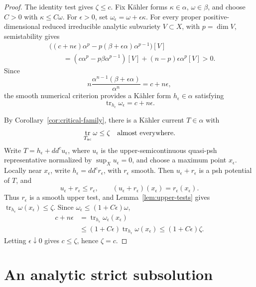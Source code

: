 \documentclass[reqno]{amsart}
\numberwithin{equation}{section}
\theoremstyle{definition}
\DeclareMathOperator{\tr}{tr}
\begin{document}
\begin{proof}
The identity test gives $\zeta\le c$. Fix K\"ahler forms
$\kappa\in\alpha$, $\omega\in\beta$, and choose $C>0$
with $\kappa\le C\omega$. For $\epsilon>0$, set
$\omega_\epsilon=\omega+\epsilon\kappa$. For every proper
positive-dimensional reduced irreducible analytic subvariety
$V\subset X$, with $p=\dim V$, semistability gives
\[
\begin{aligned}
&\bigl((c+n\epsilon)\alpha^p
-p(\beta+\epsilon\alpha)\alpha^{p-1}\bigr)[V]\\
&\qquad=(c\alpha^p-p\beta\alpha^{p-1})[V]
+(n-p)\epsilon\alpha^p[V]>0.
\end{aligned}
\]
Since
\[
n\frac{\alpha^{n-1}(\beta+\epsilon\alpha)}{\alpha^n}
=c+n\epsilon,
\]
the smooth numerical criterion \cite[Corollary 1.2]{S20}
provides a K\"ahler form $h_\epsilon\in\alpha$ satisfying
\[
\tr_{h_\epsilon}\omega_\epsilon=c+n\epsilon.
\]

By Corollary~\ref{cor:critical-family},
there is a K\"ahler current $T\in\alpha$ with
\[
\tr_{T_{\rm ac}}\omega\le\zeta
\quad\text{almost everywhere}.
\]
Write $T=h_\epsilon+dd^cu_\epsilon$, where $u_\epsilon$
is the upper-semicontinuous quasi-psh representative normalized
by $\sup_Xu_\epsilon=0$, and choose a maximum point
$x_\epsilon$. Locally near $x_\epsilon$, write
$h_\epsilon=dd^cr_\epsilon$, with $r_\epsilon$ smooth.
Then $u_\epsilon+r_\epsilon$ is a psh potential of $T$, and
\[
u_\epsilon+r_\epsilon\le r_\epsilon,\qquad
(u_\epsilon+r_\epsilon)(x_\epsilon)=r_\epsilon(x_\epsilon).
\]
Thus $r_\epsilon$ is a smooth upper test, and
Lemma~\ref{lem:upper-tests} gives
$\tr_{h_\epsilon}\omega(x_\epsilon)\le\zeta$.
Since $\omega_\epsilon\le(1+C\epsilon)\omega$,
\[
\begin{aligned}
c+n\epsilon
&=\tr_{h_\epsilon}\omega_\epsilon(x_\epsilon)\\
&\le(1+C\epsilon)
\tr_{h_\epsilon}\omega(x_\epsilon)
\le(1+C\epsilon)\zeta.
\end{aligned}
\]
Letting $\epsilon\downarrow0$ gives $c\le\zeta$, hence
$\zeta=c$.
\end{proof}

\section{An analytic strict subsolution}\label{sec:concentration}
\end{document}
